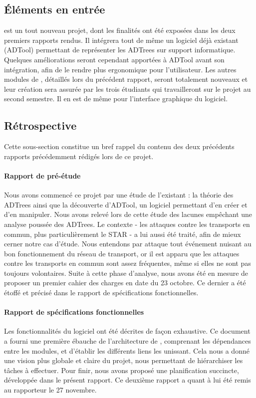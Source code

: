    \subsection{Éléments en entrée}
        \glasir{} est un tout nouveau projet, dont les finalités ont été exposées dans les deux premiers rapports rendus. Il intégrera tout de même un logiciel déjà existant (ADTool) permettant de représenter les ADTrees sur support informatique. Quelques améliorations seront cependant apportées à ADTool avant son intégration, afin de le rendre plus ergonomique pour l'utilisateur. Les autres modules de \glasir{}, détaillés lors du précédent rapport, seront totalement nouveaux et leur création sera assurée par les trois étudiants qui travailleront sur le projet au second semestre. Il en est de même pour l'interface graphique du logiciel.

    \subsection{Rétrospective} 
        Cette sous-section constitue un bref rappel du contenu des deux précédents rapports précédemment rédigés lors de ce projet.

        \paragraph{Rapport de pré-étude} %
         Nous avons commencé ce projet par une étude de l'existant : la théorie des ADTrees ainsi que la découverte d'ADTool, un logiciel permettant d'en créer et d'en manipuler. Nous avons relevé lors de cette étude des lacunes empêchant une analyse poussée des ADTrees. Le contexte - les attaques contre les transports en commun, plus particulièrement le STAR - a lui aussi été traité, afin de mieux cerner notre cas d'étude. Nous entendons par \og attaque \fg{} tout événement nuisant au bon fonctionnement du réseau de transport, or il est apparu que les attaques contre les transports en commun sont assez fréquentes, même si elles ne sont pas toujours volontaires. Suite à cette phase d'analyse, nous avons été en mesure de proposer un premier cahier des charges en date du 23 octobre. Ce dernier a été étoffé et précisé dans le rapport de spécifications fonctionnelles. %

        \paragraph{Rapport de spécifications fonctionnelles} %
        Les fonctionnalités du logiciel ont été décrites de façon exhaustive. Ce document a fourni une première ébauche de l'architecture de \glasir{}, comprenant les dépendances entre les modules, et d'établir les différents liens les unissant. Cela nous a donné une vision plus globale et claire du projet, nous permettant de hiérarchiser les tâches à effectuer. Pour finir, nous avons proposé une planification succincte, développée dans le présent rapport. Ce deuxième rapport a quant à lui été remis au rapporteur le 27 novembre.

